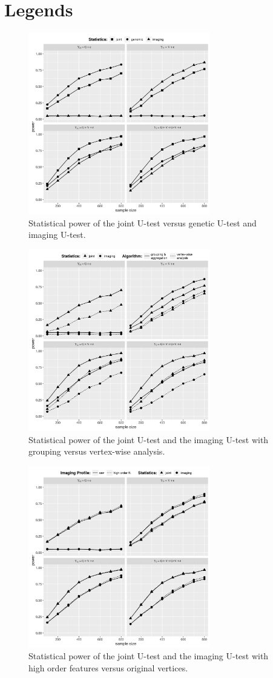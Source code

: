 \documentclass[11pt]{article}
\begin{document}
\section*{Legends}
\begin{figure}[!h]
  \centering
  \includegraphics[width=300px]{img/PWR_CNT_KNL.png}
  \caption{Statistical power of the joint U-test versus genetic U-test and imaging U-test.}
  \label{fig:PWR_CNT_KNL}
\end{figure} 
%
\begin{figure}[!h]
  \centering
  \includegraphics[width=300px]{img/PWR_CNT_VWA.png}
  \caption{Statistical power of the joint U-test and the imaging U-test with grouping versus vertex-wise analysis.}\label{fig:PWR_CNT_VWA}
\end{figure}
% 
\begin{figure}[!h]
  \centering
  \includegraphics[width=300px]{img/PWR_CNT_SAE.png}
  \caption{Statistical power of the joint U-test and the imaging U-test with high order features versus original vertices.}\label{fig:PWR_CNT_SAE}
\end{figure}
\end{document}
